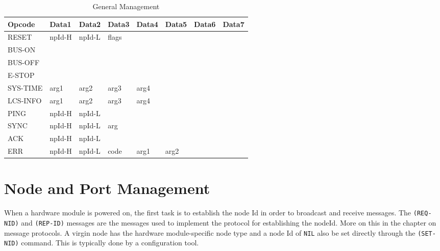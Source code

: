 \begin{table}[h!]
    \begin{center}
        \caption{General Management}
        \begin{tabular}{|l|l|l|l|l|l|l|l|}
            \toprule
            \textbf{Opcode} & \textbf{Data1} & \textbf{Data2} & \textbf{Data3} & \textbf{Data4} & \textbf{Data5} & \textbf{Data6} & \textbf{Data7} \\
            \midrule
            RESET & npId-H & npId-L & flags & & & & \\
            BUS-ON & & & & & & & \\
            BUS-OFF & & & & & & & \\
            E-STOP & & & & & & & \\
            SYS-TIME & arg1 & arg2 & arg3 & arg4 & & & \\
            LCS-INFO & arg1 & arg2 & arg3 & arg4 & & & \\
            PING & npId-H & npId-L & & & & & \\
            SYNC & npId-H & npId-L & arg & & & & \\
            ACK & npId-H & npId-L & & & & & \\
            ERR & npId-H & npId-L & code & arg1 & arg2 & & \\
            \bottomrule
        \end{tabular}
    \end{center}
\end{table}

\section{Node and Port Management}

When a hardware module is powered on, the first task is to establish the node Id in order to broadcast and receive messages. The \texttt{(REQ-NID)} and \texttt{(REP-ID)} messages are the messages used to implement the protocol for establishing the nodeId. More on this in the chapter on message protocols. A virgin node has the hardware module-specific node type and a node Id of \texttt{NIL} also be set directly through the \texttt{(SET-NID)} command. This is typically done by a configuration tool.

